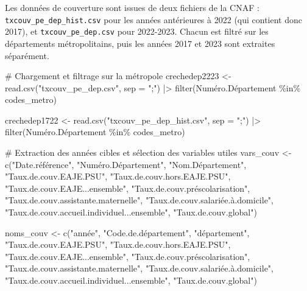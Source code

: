 \documentclass[
  letterpaper,
  DIV=11,
  numbers=noendperiod]{scrartcl}
\newenvironment{Shaded}{\begin{snugshade}}{\end{snugshade}}
\newcommand{\AttributeTok}[1]{\textcolor[rgb]{0.40,0.45,0.13}{#1}}
\newcommand{\CommentTok}[1]{\textcolor[rgb]{0.37,0.37,0.37}{#1}}
\newcommand{\FunctionTok}[1]{\textcolor[rgb]{0.28,0.35,0.67}{#1}}
\newcommand{\NormalTok}[1]{\textcolor[rgb]{0.00,0.23,0.31}{#1}}
\newcommand{\OtherTok}[1]{\textcolor[rgb]{0.00,0.23,0.31}{#1}}
\newcommand{\SpecialCharTok}[1]{\textcolor[rgb]{0.37,0.37,0.37}{#1}}
\newcommand{\StringTok}[1]{\textcolor[rgb]{0.13,0.47,0.30}{#1}}
\begin{document}
Les données de couverture sont issues de deux fichiers de la CNAF :
\texttt{txcouv\_pe\_dep\_hist.csv} pour les années antérieures à 2022
(qui contient donc 2017), et \texttt{txcouv\_pe\_dep.csv} pour
2022-2023. Chacun est filtré sur les départements métropolitains, puis
les années 2017 et 2023 sont extraites séparément.

\begin{Shaded}
\begin{Highlighting}[]
\CommentTok{\# Chargement et filtrage sur la métropole}
\NormalTok{crechedep2223 }\OtherTok{\textless{}{-}} \FunctionTok{read.csv}\NormalTok{(}\StringTok{"txcouv\_pe\_dep.csv"}\NormalTok{,      }\AttributeTok{sep =} \StringTok{";"}\NormalTok{) }\SpecialCharTok{|\textgreater{}}
  \FunctionTok{filter}\NormalTok{(Numéro.Département }\SpecialCharTok{\%in\%}\NormalTok{ codes\_metro)}

\NormalTok{crechedep1722 }\OtherTok{\textless{}{-}} \FunctionTok{read.csv}\NormalTok{(}\StringTok{"txcouv\_pe\_dep\_hist.csv"}\NormalTok{, }\AttributeTok{sep =} \StringTok{";"}\NormalTok{) }\SpecialCharTok{|\textgreater{}}
  \FunctionTok{filter}\NormalTok{(Numéro.Département }\SpecialCharTok{\%in\%}\NormalTok{ codes\_metro)}

\CommentTok{\# Extraction des années cibles et sélection des variables utiles}
\NormalTok{vars\_couv }\OtherTok{\textless{}{-}} \FunctionTok{c}\NormalTok{(}\StringTok{"Date.référence"}\NormalTok{, }\StringTok{"Numéro.Département"}\NormalTok{, }\StringTok{"Nom.Département"}\NormalTok{,}
               \StringTok{"Taux.de.couv.EAJE.PSU"}\NormalTok{, }\StringTok{"Taux.de.couv.hors.EAJE.PSU"}\NormalTok{,}
               \StringTok{"Taux.de.couv.EAJE...ensemble"}\NormalTok{, }\StringTok{"Taux.de.couv.préscolarisation"}\NormalTok{,}
               \StringTok{"Taux.de.couv.assistante.maternelle"}\NormalTok{, }\StringTok{"Taux.de.couv.salariée.à.domicile"}\NormalTok{,}
               \StringTok{"Taux.de.couv.accueil.individuel...ensemble"}\NormalTok{, }\StringTok{"Taux.de.couv.global"}\NormalTok{)}

\NormalTok{noms\_couv }\OtherTok{\textless{}{-}} \FunctionTok{c}\NormalTok{(}\StringTok{"année"}\NormalTok{, }\StringTok{"Code.de.département"}\NormalTok{, }\StringTok{"département"}\NormalTok{,}
               \StringTok{"Taux.de.couv.EAJE.PSU"}\NormalTok{, }\StringTok{"Taux.de.couv.hors.EAJE.PSU"}\NormalTok{,}
               \StringTok{"Taux.de.couv.EAJE...ensemble"}\NormalTok{, }\StringTok{"Taux.de.couv.préscolarisation"}\NormalTok{,}
               \StringTok{"Taux.de.couv.assistante.maternelle"}\NormalTok{, }\StringTok{"Taux.de.couv.salariée.à.domicile"}\NormalTok{,}
               \StringTok{"Taux.de.couv.accueil.individuel...ensemble"}\NormalTok{, }\StringTok{"Taux.de.couv.global"}\NormalTok{)}


\end{Highlighting}
\end{Shaded}
\end{document}
